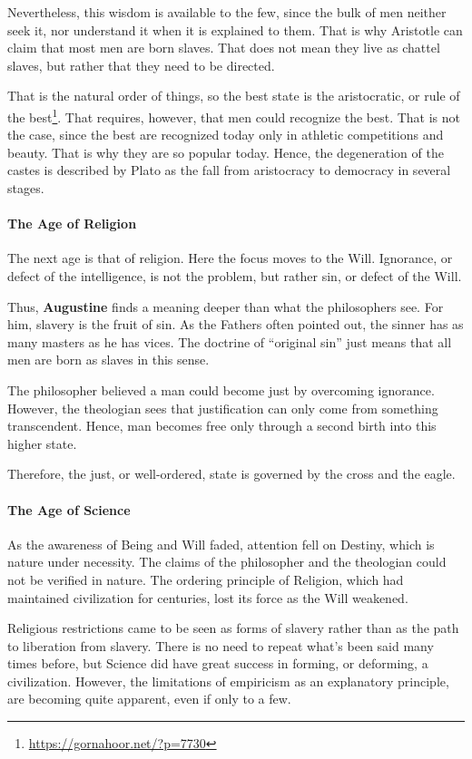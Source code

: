 Nevertheless, this wisdom is available to the few, since the bulk of men neither seek it, nor understand it when it is explained to them. That is why Aristotle can claim that most men are born slaves. That does not mean they live as chattel slaves, but rather that they need to be directed.

That is the natural order of things, so the best state is the aristocratic, or rule of the best\footnote{\url{https://gornahoor.net/?p=7730}}. That requires, however, that men could recognize the best. That is not the case, since the best are recognized today only in athletic competitions and beauty. That is why they are so popular today. Hence, the degeneration of the castes is described by Plato as the fall from aristocracy to democracy in several stages.

\paragraph{The Age of Religion}


The next age is that of religion. Here the focus moves to the Will. Ignorance, or defect of the intelligence, is not the problem, but rather sin, or defect of the Will.

Thus, \textbf{Augustine} finds a meaning deeper than what the philosophers see. For him, slavery is the fruit of sin. As the Fathers often pointed out, the sinner has as many masters as he has vices. The doctrine of ``original sin'' just means that all men are born as slaves in this sense.

The philosopher believed a man could become just by overcoming ignorance. However, the theologian sees that justification can only come from something transcendent. Hence, man becomes free only through a second birth into this higher state.

Therefore, the just, or well-ordered, state is governed by the cross and the eagle.

\paragraph{The Age of Science}


As the awareness of Being and Will faded, attention fell on Destiny, which is nature under necessity. The claims of the philosopher and the theologian could not be verified in nature. The ordering principle of Religion, which had maintained civilization for centuries, lost its force as the Will weakened.

Religious restrictions came to be seen as forms of slavery rather than as the path to liberation from slavery. There is no need to repeat what's been said many times before, but Science did have great success in forming, or deforming, a civilization. However, the limitations of empiricism as an explanatory principle, are becoming quite apparent, even if only to a few.

